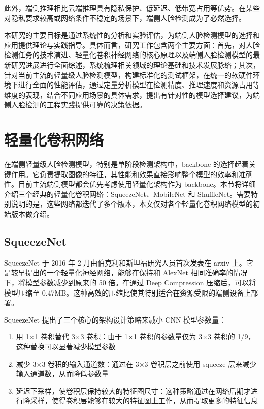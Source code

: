 \documentclass{article}
\begin{document}
此外，端侧推理相比云端推理具有隐私保护、低延迟、低带宽占用等优势。在某些对隐私要求较高或网络条件不稳定的场景下，端侧人脸检测成为了必然选择。

本研究的主要目标是通过系统性的分析和实验评估，为端侧人脸检测模型的选择和应用提供理论与实践指导。具体而言，研究工作包含两个主要方面：首先，对人脸检测任务的技术演进、轻量化卷积神经网络的核心原理以及端侧人脸检测模型的最新研究进展进行全面综述，系统梳理相关领域的理论基础和技术发展脉络；其次，针对当前主流的轻量级人脸检测模型，构建标准化的测试框架，在统一的软硬件环境下进行全面的性能评估，通过定量分析模型在检测精度、推理速度和资源占用等维度的表现，结合不同应用场景的具体需求，提出有针对性的模型选择建议，为端侧人脸检测的工程实践提供可靠的决策依据。

\clearpage

\section{轻量化卷积网络}

在端侧轻量级人脸检测模型，特别是单阶段检测架构中，backbone 的选择起着关键作用。它负责提取图像的特征，其性能和效果直接影响整个模型的效率和准确性。目前主流端侧模型都会优先考虑使用轻量化架构作为 backbone。本节将详细介绍三个经典的轻量化卷积网络：SqueezeNet、MobileNet 和 ShuffleNet。需要特别说明的是，这些网络都迭代了多个版本，本文仅对各个轻量化卷积网络模型的初始版本做介绍。

\subsection{SqueezeNet}
SqueezeNet\cite{iandola2016squeezenet} 于 2016 年 2 月由伯克利和斯坦福研究人员首次发表在 arxiv 上。它是较早提出的一个轻量化神经网络，能够在保持和 AlexNet 相同准确率的情况下，将模型参数减少到原来的 50 倍。在通过 Deep Compression 压缩后，可以将模型压缩至 0.47MB。这种高效的压缩比使其特别适合在资源受限的端侧设备上部署。

SqueezeNet 提出了三个核心的架构设计策略来减小 CNN 模型参数量：
\begin{enumerate}
    \item 用 1$\times$1 卷积替代 3$\times$3 卷积：由于 1$\times$1 卷积的参数量仅为 3$\times$3 卷积的 1/9，这种替换可以显著减少模型参数
    \item 减少 3$\times$3 卷积的输入通道数：通过在 3$\times$3 卷积层之前使用 squeeze 层来减少输入通道数，从而降低参数量
    \item 延迟下采样，使卷积层保持较大的特征图尺寸：这种策略通过在网络后期才进行降采样，使得卷积层能够在较大的特征图上工作，从而提取更多的特征信息
\end{enumerate}
\end{document}
